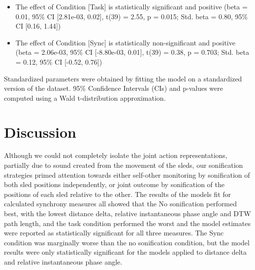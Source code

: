 \documentclass[10pt,a4paper,onecolumn]{article}
\providecommand{\tightlist}{%
  \setlength{\itemsep}{0pt}\setlength{\parskip}{0pt}}
\begin{document}
\begin{itemize}
\tightlist
\item
  The effect of Condition {[}Task{]} is statistically significant and positive (beta = 0.01, 95\% CI {[}2.81e-03, 0.02{]}, t(39) = 2.55, p = 0.015; Std. beta = 0.80, 95\% CI {[}0.16, 1.44{]})
\item
  The effect of Condition {[}Sync{]} is statistically non-significant and positive (beta = 2.06e-03, 95\% CI {[}-8.80e-03, 0.01{]}, t(39) = 0.38, p = 0.703; Std. beta = 0.12, 95\% CI {[}-0.52, 0.76{]})
\end{itemize}

Standardized parameters were obtained by fitting the model on a standardized version of the dataset. 95\% Confidence Intervals (CIs) and p-values were computed using a Wald t-distribution approximation.

\hypertarget{discussion}{%
\section{Discussion}\label{discussion}}

Although we could not completely isolate the joint action representations, partially due to sound created from the movement of the sleds, our sonification strategies primed attention towards either self-other monitoring by sonification of both sled positions independently, or joint outcome by sonification of the positions of each sled relative to the other. The results of the models fit for calculated synchrony measures all showed that the No sonification performed best, with the lowest distance delta, relative instantaneous phase angle and DTW path length, and the task condition performed the worst and the model estimates were reported as statistically significant for all three measures. The Sync condition was marginally worse than the no sonification condition, but the model results were only statistically significant for the models applied to distance delta and relative instantaneous phase angle.
\end{document}
